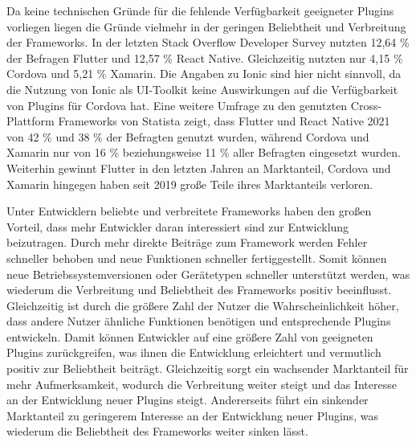 Da keine technischen Gründe für die fehlende Verfügbarkeit geeigneter Plugins vorliegen liegen die Gründe vielmehr in der geringen Beliebtheit und Verbreitung der Frameworks.
In der letzten Stack Overflow Developer Survey \cite{Stackoverflow_2022} nutzten 12,64 \% der Befragen Flutter und 12,57 \% React Native.
Gleichzeitig nutzten nur 4,15 \% Cordova und 5,21 \% Xamarin.
Die Angaben zu Ionic sind hier nicht sinnvoll, da die Nutzung von Ionic als UI-Toolkit keine Auswirkungen auf die Verfügbarkeit von Plugins für Cordova hat.
Eine weitere Umfrage zu den genutzten Cross-Plattform Frameworks von Statista \cite{Statista_UsedCrossPlatformFrameworks} zeigt, dass Flutter und React Native 2021 von 42 \% und 38 \% der Befragten genutzt wurden, während Cordova und Xamarin nur von 16 \% beziehungsweise 11 \% aller Befragten eingesetzt wurden.
Weiterhin gewinnt Flutter in den letzten Jahren an Marktanteil, Cordova und Xamarin hingegen haben seit 2019 große Teile ihres Marktanteils verloren.

Unter Entwicklern beliebte und verbreitete Frameworks haben den großen Vorteil, dass mehr Entwickler daran interessiert sind zur Entwicklung beizutragen.
Durch mehr direkte Beiträge zum Framework werden Fehler schneller behoben und neue Funktionen schneller fertiggestellt.
Somit können neue Betriebssystemversionen oder Gerätetypen schneller unterstützt werden, was wiederum die Verbreitung und Beliebtheit des Frameworks positiv beeinflusst.
Gleichzeitig ist durch die größere Zahl der Nutzer die Wahrscheinlichkeit höher, dass andere Nutzer ähnliche Funktionen benötigen und entsprechende Plugins entwickeln.
Damit können Entwickler auf eine größere Zahl von geeigneten Plugins zurückgreifen, was ihnen die Entwicklung erleichtert und vermutlich positiv zur Beliebtheit beiträgt.
Gleichzeitig sorgt ein wachsender Marktanteil für mehr Aufmerksamkeit, wodurch die Verbreitung weiter steigt und das Interesse an der Entwicklung neuer Plugins steigt.
Andererseits führt ein sinkender Marktanteil zu geringerem Interesse an der Entwicklung neuer Plugins, was wiederum die Beliebtheit des Frameworks weiter sinken lässt.

